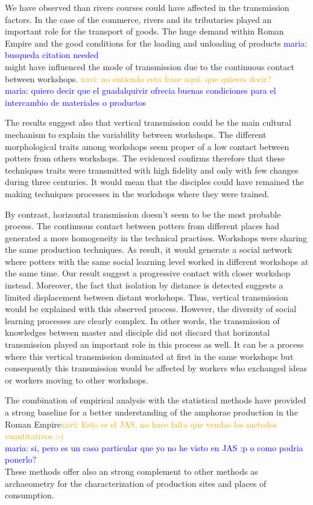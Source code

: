 \documentclass[review]{elsarticle}
\newcommand{\memo}[2]{\textcolor{#1}{#2}}
\newcommand{\xavi}[1]{\memo{orange}{xavi: #1\\}}
\newcommand{\maria}[1]{\memo{blue}{maria: #1\\}}
\begin{document}
We have observed than rivers courses could have affected in the transmission factors. In the case of the commerce, rivers and its tributaries played an important role for the transport of goods. The huge demand within Roman Empire and the good conditions for the loading and unloading of products \maria {busqueda citation needed} might have influenced the mode of transmission due to the continuous contact between workshops. \xavi{no entiendo esta frase aqui. que quieres decir?} 
\maria{quiero decir que el guadalquivir ofrecia buenas condiciones para el intercambio de materiales o productos}

The results suggest also that vertical transmission could be the main cultural mechanism to explain the variability between workshops. The different morphological traits among workshops seem proper of a low contact between potters from others workshops. The evidenced confirms therefore that these techniques traits were transmitted with high fidelity and only with few changes during three centuries. It would mean that the disciples could have remained the making techniques processes in the workshops where they were trained.  

By contrast, horizontal transmission doesn't seem to be the most probable process. The continuous contact between potters from different places had generated a more homogeneity in the technical practises. Workshops were sharing the same production techniques. As result, it would generate a social network where potters with the same social learning level worked in different workshops at the same time. Our result suggest a progressive contact with closer workshop instead. Moreover, the fact that isolation by distance is detected suggests a limited displacement between distant workshops. Thus, vertical transmission would be explained with this observed process. However, the diversity of social learning processes are clearly complex. In other words, the transmission of knowledges between master and disciple did not discard that horizontal transmission played an important role in this process as well. It can be a process where this vertical transmission dominated at first in the same workshops but consequently this transmission would be affected by workers who exchanged ideas or workers moving to other workshops.  

The combination of empirical analysis with the statistical methods have provided a strong baseline for a better understanding of the amphorae production in the Roman Empire\xavi{Esto es el JAS, no hace falta que vendas los metodos cuantitativos :-)}
\maria{si, pero es un caso particular que yo no he visto en JAS :p o como podria ponerlo?} These methods offer also an strong complement to other methods as archaeometry for the characterization of production sites and places of consumption.  
\end{document}
